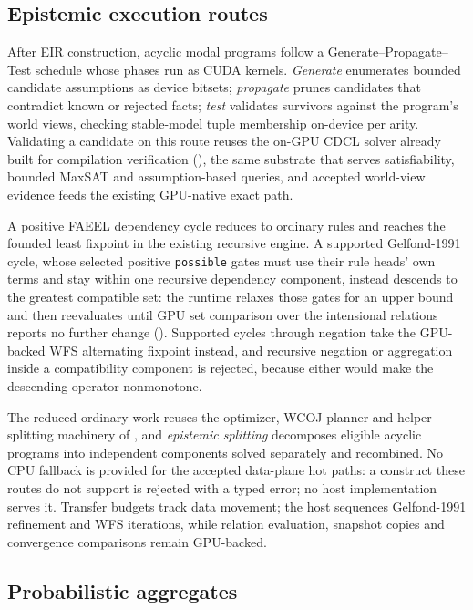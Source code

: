\subsection{Epistemic execution routes}\label{subsec:epistemic-gpu}

After EIR construction, acyclic modal programs follow a Generate--Propagate--Test schedule whose phases run as CUDA kernels. \emph{Generate} enumerates bounded candidate assumptions as device bitsets; \emph{propagate} prunes candidates that contradict known or rejected facts; \emph{test} validates survivors against the program's world views, checking stable-model tuple membership on-device per arity. Validating a candidate on this route reuses the on-GPU CDCL solver already built for compilation verification (), the same substrate that serves satisfiability, bounded MaxSAT and assumption-based queries, and accepted world-view evidence feeds the existing GPU-native exact path.

A positive FAEEL dependency cycle reduces to ordinary rules and reaches the founded least fixpoint in the existing recursive engine. A supported Gelfond-1991 cycle, whose selected positive \texttt{possible} gates must use their rule heads' own terms and stay within one recursive dependency component, instead descends to the greatest compatible set: the runtime relaxes those gates for an upper bound and then reevaluates until GPU set comparison over the intensional relations reports no further change (). Supported cycles through negation take the GPU-backed WFS alternating fixpoint instead, and recursive negation or aggregation inside a compatibility component is rejected, because either would make the descending operator nonmonotone.

The reduced ordinary work reuses the optimizer, WCOJ planner and helper-splitting machinery of , and \emph{epistemic splitting} decomposes eligible acyclic programs into independent components solved separately and recombined. No CPU fallback is provided for the accepted data-plane hot paths: a construct these routes do not support is rejected with a typed error; no host implementation serves it. Transfer budgets track data movement; the host sequences Gelfond-1991 refinement and WFS iterations, while relation evaluation, snapshot copies and convergence comparisons remain GPU-backed.

\subsection{Probabilistic aggregates}

